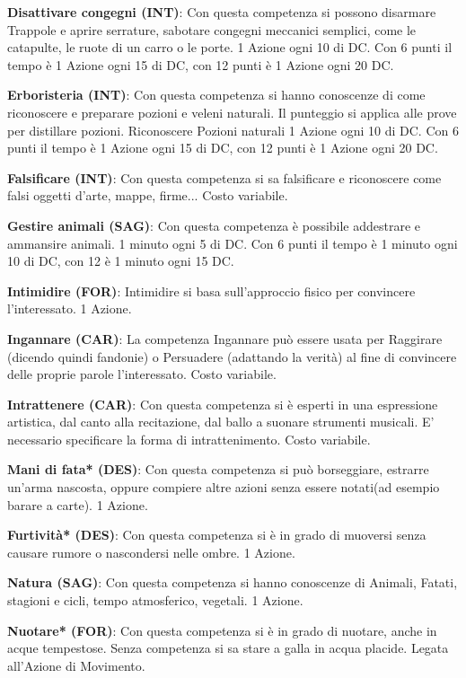 \begin{multicols}{2}
\textbf{Disattivare congegni (INT)}: Con questa competenza si possono disarmare Trappole e aprire serrature, sabotare congegni meccanici semplici, come le catapulte, le ruote di un carro o le porte. 1 Azione ogni 10 di DC. Con 6 punti il tempo è 1 Azione ogni 15 di DC, con 12 punti è 1 Azione ogni 20 DC.

\textbf{Erboristeria (INT)}: Con questa competenza si hanno conoscenze di come riconoscere e preparare pozioni e veleni naturali. Il punteggio si applica alle prove per distillare pozioni. Riconoscere Pozioni naturali 1 Azione ogni 10 di DC. Con 6 punti il tempo è 1 Azione ogni 15 di DC, con 12 punti è 1 Azione ogni 20 DC.

\textbf{Falsificare (INT)}: Con questa competenza si sa falsificare e riconoscere come falsi oggetti d'arte, mappe, firme... Costo variabile. 

\textbf{Gestire animali (SAG)}: Con questa competenza è possibile addestrare e ammansire animali. 1 minuto ogni 5 di DC. Con 6 punti il tempo è 1 minuto ogni 10 di DC, con 12 è 1 minuto ogni 15 DC.

\textbf{Intimidire (FOR)}: Intimidire si basa sull'approccio fisico per convincere l'interessato. 1 Azione.

\textbf{Ingannare (CAR)}: La competenza Ingannare può essere usata per Raggirare (dicendo quindi fandonie) o Persuadere (adattando la verità) al fine di convincere delle proprie parole l'interessato. Costo variabile.

\textbf{Intrattenere (CAR)}: Con questa competenza si è esperti in una espressione artistica, dal canto alla recitazione, dal ballo a suonare strumenti musicali. E' necessario specificare la forma di intrattenimento. Costo variabile.

\textbf{Mani di fata* (DES)}: Con questa competenza si può borseggiare, estrarre un'arma nascosta, oppure compiere altre azioni senza essere notati(ad esempio barare a carte). 1 Azione.

\textbf{Furtività* (DES)}: Con questa competenza si è in grado di muoversi senza causare rumore o nascondersi nelle ombre. 1 Azione.

\textbf{Natura (SAG)}: Con questa competenza si hanno conoscenze di Animali, Fatati, stagioni e cicli, tempo atmosferico, vegetali. 1 Azione.

\textbf{Nuotare* (FOR)}: Con questa competenza si è in grado di nuotare, anche in acque tempestose. Senza competenza si sa stare a galla in acqua placide. Legata all'Azione di Movimento.


\end{multicols}
